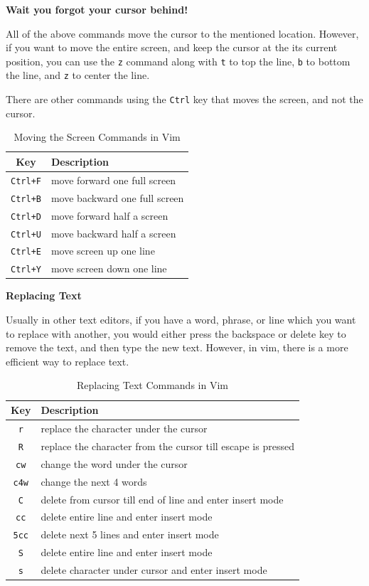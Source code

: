 \textbf{Wait you forgot your cursor behind!}

All of the above commands move the cursor to the
mentioned location. However, if you want to move
the entire screen, and keep the cursor at the
its current position, you can use the \texttt{z}
command along with \texttt{t} to top the line,
\texttt{b} to bottom the line, and \texttt{z} to
center the line.

There are other commands using the \texttt{Ctrl} key
that moves the screen, and not the cursor.

\begin{table}[h!]
  \caption{Moving the Screen Commands in Vim}
  \begin{tabular}{c l}
    \toprule
    Key & Description \\
    \midrule
    \texttt{Ctrl+F} & move forward one full screen \\
    \texttt{Ctrl+B} & move backward one full screen \\
    \texttt{Ctrl+D} & move forward half a screen \\
    \texttt{Ctrl+U} & move backward half a screen \\
    \texttt{Ctrl+E} & move screen up one line \\
    \texttt{Ctrl+Y} & move screen down one line \\
    \bottomrule
  \end{tabular}
\end{table}

\textbf{Replacing Text}

Usually in other text editors, if you have a word, phrase, or line
which you want to replace with another, you would either press
the backspace or delete key to remove the text, and then type
the new text. However, in vim, there is a more efficient way
to replace text.

\begin{table}[h!]
  \caption{Replacing Text Commands in Vim}
  \begin{tabular}{c l}
    \toprule
    Key & Description \\
    \midrule
    \texttt{r} & replace the character under the cursor \\
    \texttt{R} & replace the character from the cursor till escape is pressed \\
    \texttt{cw} & change the word under the cursor \\
    \texttt{c4w} & change the next 4 words \\
    \texttt{C} & delete from cursor till end of line and enter insert mode \\
    \texttt{cc} & delete entire line and enter insert mode \\
    \texttt{5cc} & delete next 5 lines and enter insert mode \\
    \texttt{S} & delete entire line and enter insert mode \\
    \texttt{s} & delete character under cursor and enter insert mode \\
    \bottomrule
  \end{tabular}
\end{table}

